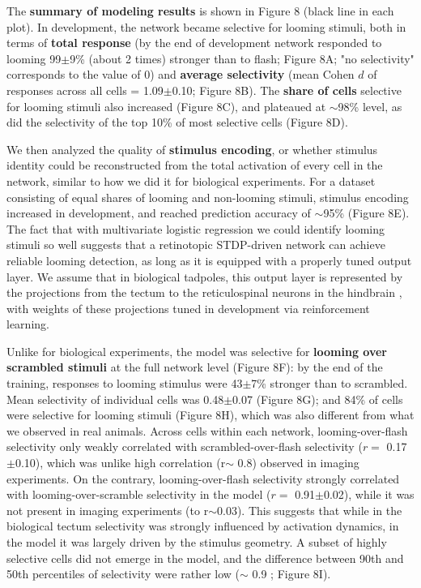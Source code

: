 \documentclass{article}
\begin{document}
The \textbf{summary of modeling results} is shown in Figure 8 (black line in each plot). In development, the network became selective for looming stimuli, both in terms of \textbf{total response} (by the end of development network responded to looming 99$\pm$9\% (about 2 times) stronger than to flash; Figure 8A; "no selectivity" corresponds to the value of 0) and \textbf{average selectivity} (mean Cohen $d$ of responses across all cells = 1.09$\pm$0.10; Figure 8B). The \textbf{share of cells} selective for looming stimuli also increased (Figure 8C), and plateaued at $\sim$98\% level, as did the selectivity of the top 10\% of most selective cells (Figure 8D).

We then analyzed the quality of \textbf{stimulus encoding}, or whether stimulus identity could be reconstructed from the total activation of every cell in the network, similar to how we did it for biological experiments. For a dataset consisting of equal shares of looming and non-looming stimuli, stimulus encoding increased in development, and reached prediction accuracy of $\sim$95\% (Figure 8E). The fact that with multivariate logistic regression we could identify looming stimuli so well suggests that a retinotopic STDP-driven network can achieve reliable looming detection, as long as it is equipped with a properly tuned output layer. We assume that in biological tadpoles, this output layer is represented by the projections from the tectum to the reticulospinal neurons in the hindbrain \citep{helmbrecht2018topography}, with weights of these projections tuned in development via reinforcement learning.

Unlike for biological experiments, the model was selective for \textbf{looming over scrambled stimuli} at the full network level (Figure 8F): by the end of the training, responses to looming stimulus were 43$\pm$7\% stronger than to scrambled. Mean selectivity of individual cells was 0.48$\pm$0.07 (Figure 8G); and 84\% of cells were selective for looming stimuli (Figure 8H), which was also different from what we observed in real animals. Across cells within each network, looming-over-flash selectivity only weakly correlated with scrambled-over-flash selectivity ($r=$ 0.17$\pm$0.10), which was unlike high correlation (r$\sim$ 0.8) observed in imaging experiments. On the contrary, looming-over-flash selectivity strongly correlated with looming-over-scramble selectivity in the model ($r=$ 0.91$\pm$0.02), while it was not present in imaging experiments (to r$\sim$0.03). This suggests that while in the biological tectum selectivity was strongly influenced by activation dynamics, in the model it was largely driven by the stimulus geometry. A subset of highly selective cells did not emerge in the model, and the difference between 90th and 50th percentiles of selectivity were rather low ($\sim$ 0.9 ; Figure 8I).
\end{document}
